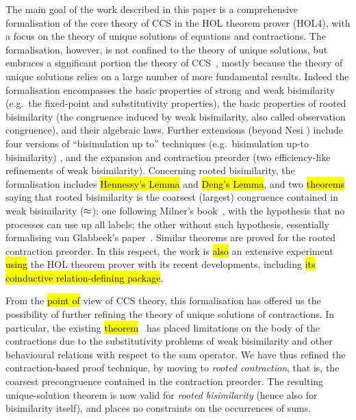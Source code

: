 The main goal of the work described in this paper is a %
comprehensive formalisation of the core theory of CCS in the HOL
theorem prover (HOL4),  with a focus on the theory of unique solutions
of equations and contractions.
The formalisation, however, is not confined to the theory of unique
solutions, but embraces a
significant portion the theory of CCS~\cite{Mil89}, mostly because the
theory of unique solutions relies on a large number of more fundamental results.
Indeed the formalisation encompasses the basic properties of strong and weak
bisimilarity (e.g.~the fixed-point and substitutivity properties), the
basic properties of
rooted bisimilarity (the congruence induced by weak
bisimilarity, also called observation congruence), and
their algebraic laws. Further extensions (beyond Nesi
\cite{Nesi:1992ve}) include four versions of ``bisimulation up to''
techniques (e.g.~bisimulation up-to bisimilarity) \cite{Mil89,sangiorgi1992problem}, and the
expansion and contraction preorder (two
efficiency-like refinements of weak bisimilarity). Concerning rooted bisimilarity, the formalisation
includes \hl{Hennessy's Lemma} and \hl{Deng's Lemma},
 and two \hl{theorems} saying that rooted bisimilarity is the coarsest (largest)
 congruence contained in weak bisimilarity ($\approx$): one following Milner's
 book~\cite{Mil89}, with the hypothesis that no processes can use up
 all labels;
the other without such hypothesis, essentially formalising van Glabbeek's paper~\cite{van2005characterisation}.
Similar theorems are proved for the rooted contraction preorder.
In this respect, the work is \hl{also} an extensive experiment \hl{using} the HOL theorem prover with its
recent developments, including \hl{its coinductive relation-defining package}.

From the \hl{point of} view of CCS theory, this formalisation has offered us the possibility of
further refining the theory of unique solutions of contractions.
In particular, the existing \hl{theorem}~\cite{sangiorgi2017equations} has
placed limitations on the body of the contractions due to the
substitutivity problems of weak bisimilarity and other behavioural relations with respect
to the sum operator.
We have thus refined the contraction-based proof technique, by moving to  
\emph{rooted contraction}, that is, the coarsest precongruence contained in the contraction
preorder. The resulting unique-solution theorem is now valid for
\emph{rooted bisimilarity} (hence also for bisimilarity itself), and places no 
constraints on the occurrences of sums.

